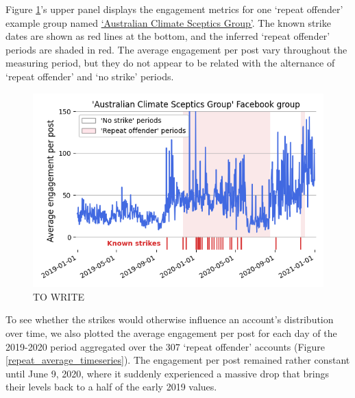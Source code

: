 \documentclass[11pt,a4paper]{article}
\begin{document}
Figure \ref{repeat_example_timeseries}'s upper panel displays the engagement metrics for one `repeat offender' example group named \href{https://www.facebook.com/groups/108655705888371/}{‘Australian Climate Sceptics Group’}. 
The known strike dates are shown as red lines at the bottom, and the inferred ‘repeat offender’ periods are shaded in red. 
The average engagement per post vary throughout the measuring period, but they do not appear to be related with the alternance of `repeat offender' and `no strike' periods.

\begin{figure}[!h]
\centering
\includegraphics[width=\linewidth]{./../figure/repeat_example_timeseries.png}
\caption{TO WRITE}
\label{repeat_example_timeseries}
\end{figure}

To see whether the strikes would otherwise influence an account's distribution over time, we also plotted the average engagement per post for each day of the 2019-2020 period aggregated over the 307 `repeat offender' accounts (Figure \ref{repeat_average_timeseries}). 
The engagement per post remained rather constant until June 9, 2020, where it suddenly experienced a massive drop that brings their levels back to a half of the early 2019 values.
\end{document}
